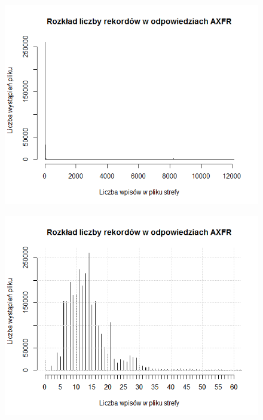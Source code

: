 \begin{figure}[ht]
	\centering
	\includegraphics[width=1.0\textwidth]{image/hist_zone_size}
	\caption{}
	\label{fig:hist_zone_size}
\end{figure}

\begin{figure}[ht]
\centering
\includegraphics[width=1.0\textwidth]{image/hist_zone_size_zoom}
\caption{}
\label{fig:hist_zone_size_zoom}
\end{figure}

